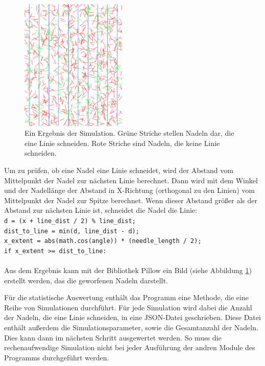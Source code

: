 \documentclass[10pt,twocolumn]{scrartcl}
\begin{document}
		\begin{figure}[htb]
			\centering
			\includegraphics[width=0.45\textwidth]{images/needels.png}
			\caption{Ein Ergebnis der Simulation. Grüne Striche stellen Nadeln dar, die eine Linie schneiden. Rote Striche sind Nadeln, die keine Linie schneiden.}
			\label{fig:needels}
		\end{figure}

		Um zu prüfen, ob eine Nadel eine Linie schneidet, wird der Abstand vom Mittelpunkt der Nadel zur nächsten Linie berechnet. Dann wird mit dem Winkel und der Nadellänge der Abstand in X-Richtung (orthogonal zu den Linien) vom Mittelpunkt der Nadel zur Spitze berechnet. Wenn dieser Abstand größer als der Abstand zur nächsten Linie ist, schneidet die Nadel die Linie:\\
		\texttt{d = (x + line\_dist / 2) \% line\_dist;\\
			dist\_to\_line = min(d, line\_dist - d);\\
			x\_extent = abs(math.cos(angle)) * (needle\_length / 2);\\
			if x\_extent >= dist\_to\_line:}\\
		\\
		Aus dem Ergebnis kann mit der Bibliothek Pillow\cite{Pillow} ein Bild (siehe Abbildung \ref{fig:needels}) erstellt werden, das die geworfenen Nadeln darstellt.

		Für die statistische Auswertung enthält das Programm eine Methode, die eine Reihe von Simulationen durchführt. Für jede Simulation wird dabei die Anzahl der Nadeln, die eine Linie schneiden, in eine JSON-Datei geschrieben. Diese Datei enthält außerdem die Simulationsparameter, sowie die Gesamtanzahl der Nadeln. Dies kann dann im nächsten Schritt ausgewertet werden. So muss die rechenaufwendige Simulation nicht bei jeder Ausführung der andren Module des Programms durchgeführt werden.
\end{document}
